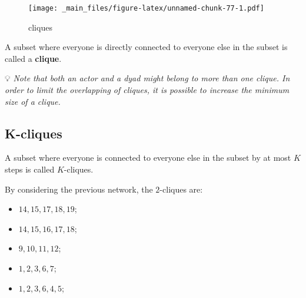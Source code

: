 \documentclass[
  notitlepage,
  onecolumn,
  openany]{book}
\providecommand{\tightlist}{%
  \setlength{\itemsep}{0pt}\setlength{\parskip}{0pt}}
\begin{document}
\begin{figure}
\centering
\texttt{[image: \_main\_files/figure-latex/unnamed-chunk-77-1.pdf]}
\caption{\label{fig:unnamed-chunk-77}cliques}
\end{figure}

A subset where everyone is directly connected to everyone else in the subset is called a \textbf{clique}.

💡 \emph{Note that both an actor and a dyad might belong to more than one clique. In order to limit the overlapping of cliques, it is possible to increase the minimum size of a clique.}

\hypertarget{k-cliques}{%
\subsection{K-cliques}\label{k-cliques}}

A subset where everyone is connected to everyone else in the subset by at most \(K\) steps is called \(K\)-cliques.

By considering the previous network, the \(2\)-cliques are:

\begin{itemize}
\tightlist
\item
  \(14, 15, 17, 18, 19\);
\item
  \(14, 15, 16, 17, 18\);
\item
  \(9, 10, 11, 12\);
\item
  \(1, 2, 3, 6, 7\);
\item
  \(1, 2, 3, 6, 4, 5\);
\end{itemize}
\end{document}
